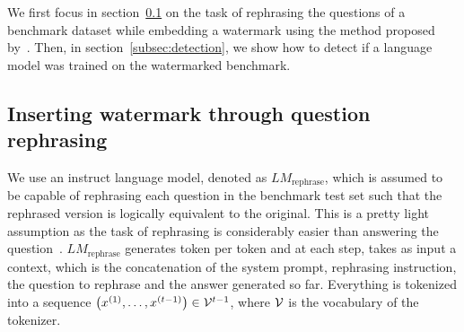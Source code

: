 We first focus in section~\ref{subsec:rephrasing} on the task of rephrasing the questions of a benchmark dataset while embedding a watermark using the method proposed by~\citet{kirchenbauer2023reliability}.
Then, in section~\ref{subsec:detection}, we show how to detect if a language model was trained on the watermarked benchmark.

\vspace{-0.1cm}
\subsection{Inserting watermark through question rephrasing}\label{subsec:rephrasing}


We use an instruct language model, denoted as $LM_{\text{rephrase}}$, which is assumed to be capable of rephrasing each question in the benchmark test set such that the rephrased version is logically equivalent to the original.
This is a pretty light assumption as the task of rephrasing is considerably easier than answering the question~\citep{deng2023rephrase}.
$LM_{\text{rephrase}}$ generates token per token and at each step, takes as input a context, which is the concatenation of the system prompt, rephrasing instruction, the question to rephrase and the answer generated so far.
Everything is tokenized into a sequence $\left( x^{(1)}, \ldots, x^{(t-1)} \right) \in \mathcal{V}^{t-1}$, where $\mathcal{V}$ is the vocabulary of the tokenizer.



